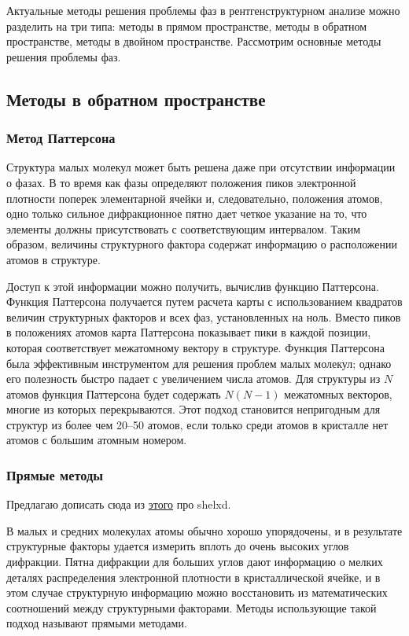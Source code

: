 \documentclass{article}
\begin{document}
Актуальные методы решения проблемы фаз в рентгенструктурном анализе можно разделить на три типа: методы в прямом пространстве, методы в обратном пространстве, методы в двойном пространстве\cite{XR-ED}. Рассмотрим основные методы решения проблемы фаз.
\subsection{Методы в обратном пространстве}
\subsubsection{Метод Паттерсона}

Структура малых молекул может быть решена даже при отсутствии информации о фазах. В то время как фазы определяют положения пиков электронной плотности поперек элементарной ячейки и, следовательно, положения атомов, одно только сильное дифракционное пятно дает четкое указание на то, что элементы должны присутствовать с соответствующим интервалом. Таким образом, величины структурного фактора содержат информацию о расположении атомов в структуре.

Доступ к этой информации можно получить, вычислив функцию Паттерсона\cite{PattersonMethod}. Функция Паттерсона получается путем расчета карты с использованием квадратов величин структурных факторов и всех фаз, установленных на ноль. Вместо пиков в положениях атомов карта Паттерсона показывает пики в каждой позиции, которая соответствует межатомному вектору в структуре. Функция Паттерсона была эффективным инструментом для решения проблем малых молекул; однако его полезность быстро падает с увеличением числа атомов. Для структуры из $N$ атомов функция Паттерсона будет содержать $N (N - 1)$ межатомных векторов, многие из которых перекрываются. Этот подход становится непригодным для структур из более чем 20–50 атомов, если только среди атомов в кристалле нет атомов с большим атомным номером.

\subsubsection{Прямые методы}

Предлагаю дописать сюда из \href{https://sci-hub.do/10.1007/0-387-33746-6}{этого} про shelxd.

В малых и средних молекулах атомы обычно хорошо упорядочены, и в результате структурные факторы удается измерить вплоть до очень высоких углов дифракции. Пятна дифракции для больших углов дают информацию о мелких деталях распределения электронной плотности в кристаллической ячейке, и в этом случае структурную информацию можно восстановить из математических соотношений между структурными факторами. Методы использующие такой подход называют прямыми методами.
\end{document}

